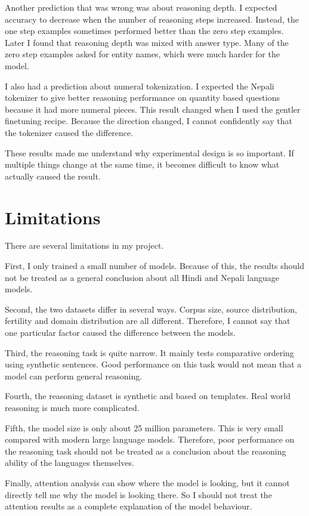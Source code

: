 \documentclass[twocolumn, 10pt]{article}
\begin{document}
Another prediction that was wrong was about reasoning depth. I expected accuracy to decrease when the number of reasoning steps increased. Instead, the one step examples sometimes performed better than the zero step examples. Later I found that reasoning depth was mixed with answer type. Many of the zero step examples asked for entity names, which were much harder for the model.

I also had a prediction about numeral tokenization. I expected the Nepali tokenizer to give better reasoning performance on quantity based questions because it had more numeral pieces. This result changed when I used the gentler finetuning recipe. Because the direction changed, I cannot confidently say that the tokenizer caused the difference.

These results made me understand why experimental design is so important. If multiple things change at the same time, it becomes difficult to know what actually caused the result.

\section{Limitations}
There are several limitations in my project.

First, I only trained a small number of models. Because of this, the results should not be treated as a general conclusion about all Hindi and Nepali language models.

Second, the two datasets differ in several ways. Corpus size, source distribution, fertility and domain distribution are all different. Therefore, I cannot say that one particular factor caused the difference between the models.

Third, the reasoning task is quite narrow. It mainly tests comparative ordering using synthetic sentences. Good performance on this task would not mean that a model can perform general reasoning.

Fourth, the reasoning dataset is synthetic and based on templates. Real world reasoning is much more complicated.

Fifth, the model size is only about 25 million parameters. This is very small compared with modern large language models. Therefore, poor performance on the reasoning task should not be treated as a conclusion about the reasoning ability of the languages themselves.

Finally, attention analysis can show where the model is looking, but it cannot directly tell me why the model is looking there. So I should not treat the attention results as a complete explanation of the model behaviour.
\end{document}
